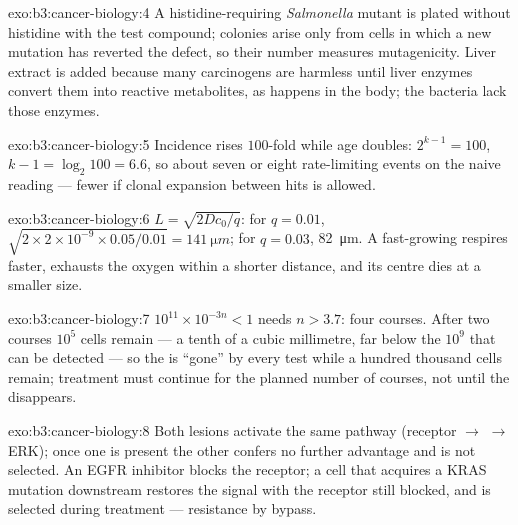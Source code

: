 \begin{solution}{exo:b3:cancer-biology:4}
A histidine-requiring \emph{Salmonella} mutant is plated without
histidine with the test compound; colonies arise only from cells in
which a new mutation has reverted the defect, so their number measures
mutagenicity. Liver extract is added because many carcinogens are
harmless until liver enzymes convert them into reactive metabolites,
as happens in the body; the bacteria lack those enzymes.
\end{solution}

\begin{solution}{exo:b3:cancer-biology:5}
Incidence rises $100$-fold while age doubles: $2^{k-1} = 100$, $k - 1 =
\log_{2}100 = 6.6$, so about seven or eight rate-limiting events on the
naive reading --- fewer if clonal expansion between hits is allowed.
\end{solution}

\begin{solution}{exo:b3:cancer-biology:6}
$L = \sqrt{2Dc_{0}/q}$: for $q = 0.01$, $\sqrt{2\times 2\times 10^{-9}
\times 0.05/0.01} = \qty{141}{\micro m}$; for $q = 0.03$,
\qty{82}{\micro m}. A fast-growing  respires faster, exhausts the
oxygen within a shorter distance, and its centre dies at a smaller size.
\end{solution}

\begin{solution}{exo:b3:cancer-biology:7}
$10^{11}\times 10^{-3n} < 1$ needs $n > 3.7$: four courses. After two
courses $10^{5}$ cells remain --- a tenth of a cubic millimetre, far
below the $10^{9}$ that can be detected --- so the  is
``gone'' by every test while a hundred thousand cells remain; treatment
must continue for the planned number of courses, not until the 
disappears.
\end{solution}

\begin{solution}{exo:b3:cancer-biology:8}
Both lesions activate the same pathway (receptor $\to$  $\to$ ERK);
once one is present the other confers no further advantage and is not
selected. An EGFR inhibitor blocks the receptor; a cell that acquires a
KRAS mutation downstream restores the signal with the receptor still
blocked, and is selected during treatment --- resistance by bypass.
\end{solution}

